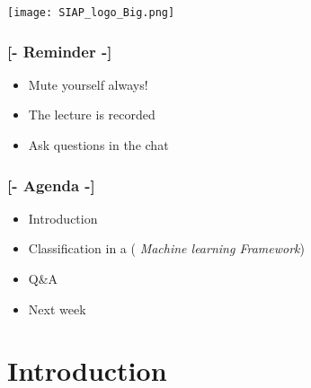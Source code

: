 \documentclass[xcolor=x11names,compress, aspectratio=169]{beamer}
\renewcommand{\(}{\begin{columns}}
\renewcommand{\)}{\end{columns}}
\newcommand{\<}[1]{\begin{column}{#1}}
\renewcommand{\>}{\end{column}}
\begin{document}


\begin{frame}
\Large{ \color{siap}{Machine Learning for Official Statistics and SDGs}}

\hspace{1cm}


\hspace{2cm}
\begin{center}

\texttt{[image: SIAP\_logo\_Big.png]}

\end{center}
\end{frame}



\begin{frame} %
\frametitle{\textcolor{brique}{[-  \textbf{Reminder} -]}}
\begin{itemize}[<+-|alert@+>]
   \item Mute yourself \textcolor{brique}{always}!
   \item The lecture is recorded
   \item Ask questions in the chat
\end{itemize}
\end{frame}

\begin{frame} %
\frametitle{\textcolor{brique}{[-  \textbf{Agenda} -]}}
\begin{itemize}[<+-|alert@+>]
   \item Introduction
   \item Classification in a (\emph{ Machine learning Framework})
   \item Q\&A
   \item Next week
\end{itemize}
\end{frame}


\section{Introduction}
\end{document}
